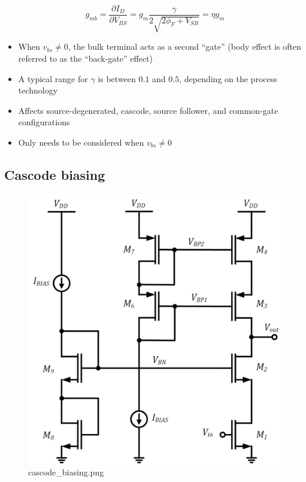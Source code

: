 \documentclass[11pt]{article}
\providecommand{\tightlist}{%
      \setlength{\itemsep}{0pt}\setlength{\parskip}{0pt}}
\begin{document}
    \begin{equation}
g_{mb} = \dfrac{\partial I_D}{\partial V_{BS}} = g_m \dfrac{\gamma}{2\sqrt{2\phi_F + V_{SB}}} = \eta g_m
\end{equation}

    \begin{itemize}
\tightlist
\item
  When \(v_{bs} \neq 0\), the bulk terminal acts as a second ``gate''
  (body effect is often referred to as the ``back-gate'' effect)
\item
  A typical range for \(\gamma\) is between \(0.1\) and \(0.5\),
  depending on the process technology
\item
  Affects source-degenerated, cascode, source follower, and common-gate
  configurations
\item
  Only needs to be considered when \(v_{bs} \neq 0\)
\end{itemize}

    \hypertarget{cascode-biasing}{%
\subsection{Cascode biasing}\label{cascode-biasing}}

    \begin{figure}
\centering
\includegraphics{cascode_biasing.png}
\caption{cascode\_biasing.png}
\end{figure}
\end{document}
